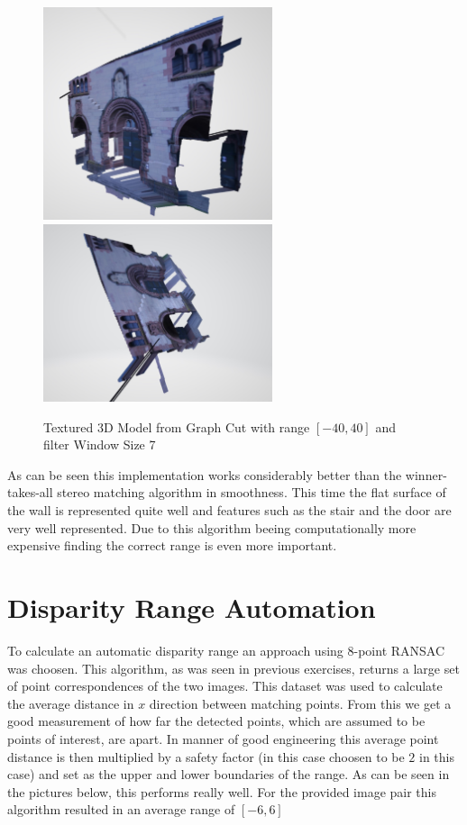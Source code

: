 \documentclass[12pt]{article}
\begin{document}
\begin{figure}[H]
	\centering
	\includegraphics[width=0.6\textwidth]{gc_model_1.jpg}
	\includegraphics[width=0.6\textwidth]{gc_model_2.jpg}
	\caption{Textured 3D Model from Graph Cut with range $[-40, 40]$ and filter Window Size 7}
	\label{fig1}
\end{figure}

As can be seen this implementation works considerably better than the winner-takes-all stereo matching algorithm in smoothness. This time the flat surface of the wall is represented quite well and features such as the stair and the door are very well represented. Due to this algorithm beeing computationally more expensive finding the correct range is even more important. 

\section{Disparity Range Automation}

To calculate an automatic disparity range an approach using 8-point RANSAC was choosen. This algorithm, as was seen in previous exercises, returns a large set of point correspondences of the two images. This dataset was used to calculate the average distance in $x$ direction between matching points. From this we get a good measurement of how far the detected points, which are assumed to be points of interest, are apart. In manner of good engineering this average point distance is then multiplied by a safety factor (in this case choosen to be $2$ in this case) and set as the upper and lower boundaries of the range. As can be seen in the pictures below, this performs really well. For the provided image pair this algorithm resulted in an average range of $[-6, 6]$
\end{document}
